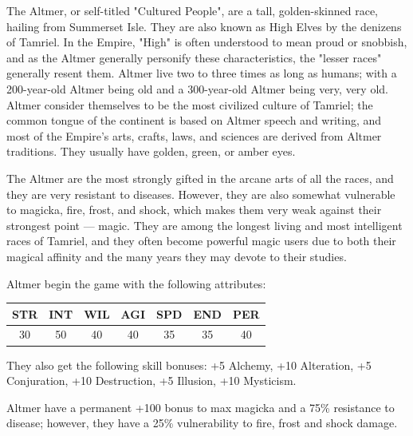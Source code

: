 \documentclass[12pt]{book}
\begin{document}
The Altmer, or self-titled "Cultured People", are a tall, golden-skinned race, hailing from Summerset Isle. They are also known as High Elves by the denizens of Tamriel. In the Empire, "High" is often understood to mean proud or snobbish, and as the Altmer generally personify these characteristics, the "lesser races" generally resent them. Altmer live two to three times as long as humans; with a 200-year-old Altmer being old and a 300-year-old Altmer being very, very old. Altmer consider themselves to be the most civilized culture of Tamriel; the common tongue of the continent is based on Altmer speech and writing, and most of the Empire's arts, crafts, laws, and sciences are derived from Altmer traditions. They usually have golden, green, or amber eyes.

The Altmer are the most strongly gifted in the arcane arts of all the races, and they are very resistant to diseases. However, they are also somewhat vulnerable to magicka, fire, frost, and shock, which makes them very weak against their strongest point --- magic. They are among the longest living and most intelligent races of Tamriel, and they often become powerful magic users due to both their magical affinity and the many years they may devote to their studies.

Altmer begin the game with the following attributes:

\begin{center}
\begin{tabular}{|c|c|c|c|c|c|c|}
\hline
STR & INT & WIL & AGI & SPD & END & PER\\ \hline
30 & 50 & 40 & 40 & 35 & 35 & 40\\ \hline
\end{tabular}
\end{center}

They also get the following skill bonuses: +5 Alchemy, +10 Alteration, +5 Conjuration, +10 Destruction, +5 Illusion, +10 Mysticism.

Altmer have a permanent +100 bonus to max magicka and a 75\% resistance to disease; however, they have a 25\% vulnerability to fire, frost and shock damage.
\end{document}
